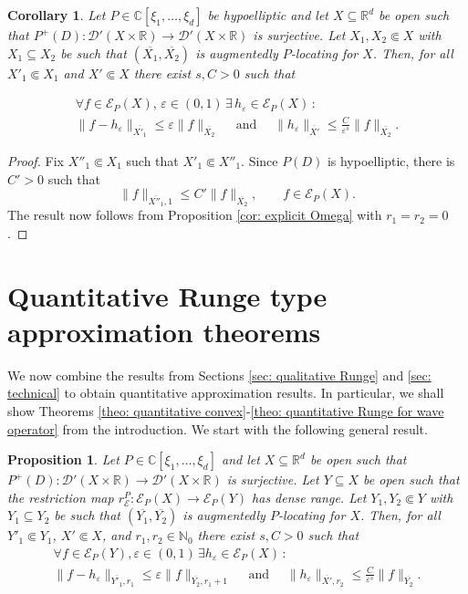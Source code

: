\documentclass[12pt]{amsart}
\newcommand{\N}{\mathbb{N}}
\newcommand{\R}{\mathbb{R}}
\newcommand{\C}{\mathbb{C}}
\newtheorem{proposition}[theorem]{Proposition}
\newtheorem{corollary}[theorem]{Corollary}
\theoremstyle{definition}
\theoremstyle{remark}
\numberwithin{equation}{section}
\begin{document}
\begin{corollary}\label{cor: explicit Omega-hypo}
	Let $P\in\C[\xi_1,\ldots,\xi_d]$  be hypoelliptic and let $X \subseteq \R^d$ be open such that $P^+(D): \mathscr{D}'(X \times \R) \to \mathscr{D}'(X \times \R)$ is surjective. Let $X_1, X_2 \Subset X$ with $X_1 \subseteq X_2$ be such that $(\overline{X_1}, \overline{X_2})$ is augmentedly $P$-locating for $X$. Then, for all $X'_1 \Subset X_1$ and $X' \Subset X$  there exist $s, C>0$ such that
	
	\begin{gather*}
		\forall f \in\mathscr{E}_P(X),\,\varepsilon\in (0,1) \,\exists\,h_\varepsilon \in\mathscr{E}_P(X) \,:\, \\ 
		\|f-h_\varepsilon\|_{\overline{X'_1}}\leq\varepsilon\|f\|_{\overline{X_2}} \quad
		\mbox{ and } \quad \|h_\varepsilon\|_{\overline{X'}}\leq\frac{C}{\varepsilon^s}\|f\|_{\overline{X_2}}.
	\end{gather*}
\end{corollary}
\begin{proof}
	Fix $X''_1 \Subset X_1$ such that $X'_1 \Subset X''_1$. Since $P(D)$ is hypoelliptic, there is $C' >0$ such that
	$$
	\|f\|_{\overline{X''_1},1} \leq C' \|f\|_{\overline{X_2}}, \qquad f \in \mathscr{E}_P(X).
	$$
The result now follows from  Proposition \ref{cor: explicit Omega} with $r_1 = r_2 = 0$.
\end{proof}

\section{Quantitative Runge type approximation theorems}\label{sec: quantitative Runge}
We now combine the results from Sections \ref{sec: qualitative Runge} and \ref{sec: technical} to obtain quantitative approximation results. In particular, we shall show Theorems \ref{theo: quantitative convex}-\ref{theo: quantitative Runge for wave operator} from the introduction. We start with the following general result.

\begin{proposition}\label{prop: general quantitative} 
	Let $P\in\C[\xi_1,\ldots,\xi_d]$ and let $X\subseteq\R^d$ be open such that $P^+(D): \mathscr{D}'(X\times\R) \to \mathscr{D}'(X\times\R)$ is surjective. Let $Y \subseteq X$ be open such that  the restriction map $r_{\mathscr{E}}^P:\mathscr{E}_P(X)\rightarrow\mathscr{E}_P(Y)$ has dense range.  Let $Y_1, Y_2 \Subset Y$ with $Y_1 \subseteq Y_2$ be such that $(\overline{Y_1}, \overline{Y_2})$ is augmentedly $P$-locating for $X$. Then, for all $Y'_1 \Subset Y_1$, $X' \Subset X$, and  $r_1,r_2\in\N_0$  there exist $s, C>0$ such that
	\begin{gather*}
		\forall f\in\mathscr{E}_P(Y), \varepsilon\in (0,1) \,\exists h_\varepsilon \in\mathscr{E}_P(X) \, :\\
		\|f-h_\varepsilon\|_{\overline{Y'_1},r_1}\leq \varepsilon\|f\|_{\overline{Y_2},r_1+1} \quad \mbox{ and } \quad \|h_\varepsilon\|_{\overline{X'},r_2}\leq\frac{C}{\varepsilon^s}\|f\|_{\overline{Y_2}}.
			\end{gather*}
\end{proposition}
\end{document}
